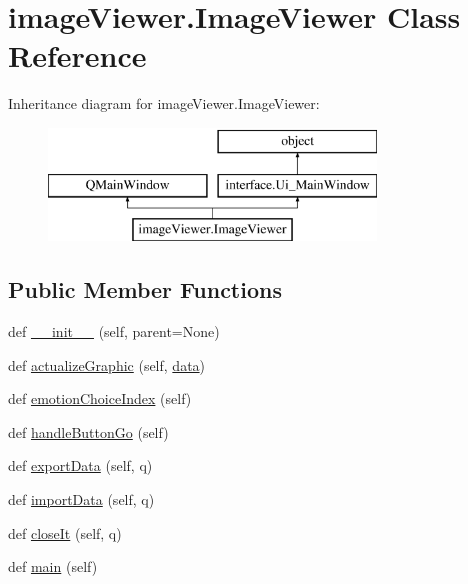 \hypertarget{classimage_viewer_1_1_image_viewer}{}\section{image\+Viewer.\+Image\+Viewer Class Reference}
\label{classimage_viewer_1_1_image_viewer}
Inheritance diagram for image\+Viewer.\+Image\+Viewer\+:\begin{figure}[H]
\begin{center}
\leavevmode
\includegraphics[height=3.000000cm]{classimage_viewer_1_1_image_viewer}
\end{center}
\end{figure}
\subsection*{Public Member Functions}
\begin{DoxyCompactItemize}
\item 
def \hyperlink{classimage_viewer_1_1_image_viewer_a4fcb4e2fe09cf05f19b3bc82589a8cbd}{\+\_\+\+\_\+init\+\_\+\+\_\+} (self, parent=None)
\item 
def \hyperlink{classimage_viewer_1_1_image_viewer_a840eb8b561d25e8ec293729f00a3af46}{actualize\+Graphic} (self, \hyperlink{classimage_viewer_1_1_image_viewer_a419a3fb29273b2b3c9d6e81539947c36}{data})
\item 
def \hyperlink{classimage_viewer_1_1_image_viewer_a11fedbac6884fc3892cfd8df62bc6cbb}{emotion\+Choice\+Index} (self)
\item 
def \hyperlink{classimage_viewer_1_1_image_viewer_a1108b9a6fc21bd740e613271fd8ac3a7}{handle\+Button\+Go} (self)
\item 
def \hyperlink{classimage_viewer_1_1_image_viewer_ab3d7625a14c419a321861bd11d44cca9}{export\+Data} (self, q)
\item 
def \hyperlink{classimage_viewer_1_1_image_viewer_a42d9f543446b850d0e5eefc638c8e031}{import\+Data} (self, q)
\item 
def \hyperlink{classimage_viewer_1_1_image_viewer_a6b1740bea38c92d32b87204a6203377e}{close\+It} (self, q)
\item 
def \hyperlink{classimage_viewer_1_1_image_viewer_ab5f9d4ae528bd32e14fae6cf9673d467}{main} (self)
\end{DoxyCompactItemize}
